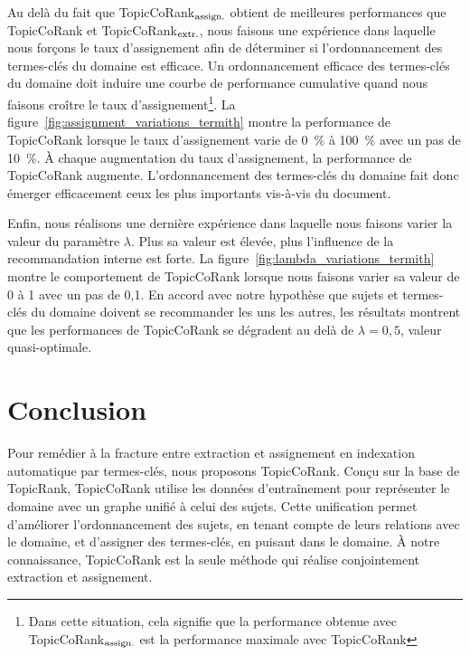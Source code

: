       Au delà du fait que TopicCoRank$_\textnormal{assign.}$ obtient de
      meilleures performances que TopicCoRank et
      TopicCoRank$_\textnormal{extr.}$, nous faisons une expérience dans
      laquelle nous forçons le taux d'assignement afin de déterminer si
      l'ordonnancement des termes-clés du domaine est efficace.
      Un ordonnancement efficace des termes-clés du domaine doit induire une
      courbe de performance cumulative quand nous faisons croître le taux
      d'assignement\footnote{Dans cette situation, cela signifie que la
      performance obtenue avec TopicCoRank$_\textnormal{assign.}$ est la
      performance maximale avec TopicCoRank}. La
      figure~\ref{fig:assignment_variations_termith} montre la performance de
      TopicCoRank lorsque le taux d'assignement varie de 0~\% à 100~\% avec un
      pas de 10~\%. À chaque augmentation du taux d'assignement, la
      performance de TopicCoRank augmente. L'ordonnancement des termes-clés du
      domaine fait donc émerger efficacement ceux les plus
      importants vis-à-vis du document.
      

      Enfin, nous réalisons une dernière expérience dans laquelle nous faisons
      varier la valeur du paramètre $\lambda$. Plus sa valeur est élevée, plus
      l'influence de la recommandation interne est forte. La
      figure~\ref{fig:lambda_variations_termith} montre le comportement de
      TopicCoRank lorsque nous faisons varier sa valeur de 0 à 1
      avec un pas de 0,1. En accord avec notre hypothèse que sujets et
      termes-clés du domaine doivent se recommander les uns les autres, les
      résultats montrent que les performances de TopicCoRank se dégradent au
      delà de $\lambda = 0,5$, valeur quasi-optimale.
      


\section{Conclusion}
\label{sec:main-domain_specific_keyphrase_annotation-conclusion}
  Pour remédier à la fracture entre extraction et assignement en indexation
  automatique par termes-clés, nous proposons TopicCoRank. Conçu sur la base
  de TopicRank, TopicCoRank utilise les données d'entraînement pour
  représenter le domaine avec un graphe unifié à celui des sujets. Cette
  unification permet d'améliorer l'ordonnancement des sujets, en tenant compte
  de leurs relations avec le domaine, et d'assigner des termes-clés, en
  puisant dans le domaine. À notre connaissance, TopicCoRank est la seule
  méthode qui réalise conjointement extraction et assignement.

